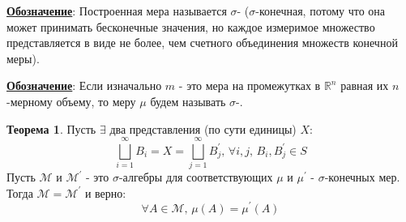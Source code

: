 \documentclass[12pt]{article}
\newcommand{\MR}{\mathbb{R}}
\newcommand{\MM}{\mathcal{M}}
\theoremstyle{definition}
\newtheorem{theorem}{Теорема}
\begin{document}
\textbf{\uline{Обозначение}}: Построенная мера называется $\sigma$- ($\sigma$-конечная, потому что она может принимать бесконечные значения, но каждое измеримое множество представляется в виде не более, чем счетного объединения множеств конечной меры). 

\textbf{\uline{Обозначение}}: Если изначально $m$ - это мера на промежутках в $\MR^n$ равная их $n$-мерному объему, то меру $\mu$ будем называть  $\sigma$-.

\begin{theorem}
	Пусть $\exists$ два представления (по сути единицы) $X$:
	$$
		\bigsqcup\limits_{i = 1}^{\infty}B_i = X = \bigsqcup\limits_{j = 1}^{\infty}B_j^\prime, \, \forall i,j,\, B_i, B_j^\prime \in S 
	$$
	Пусть $\MM$ и $\MM^\prime$ - это $\sigma$-алгебры для соответствующих $\mu$ и $\mu^\prime$ - $\sigma$-конечных мер. Тогда $\MM = \MM^\prime$ и верно:
	$$
		\forall A \in \MM,\, \mu(A) = \mu^\prime(A)
	$$
\end{theorem}
\end{document}
